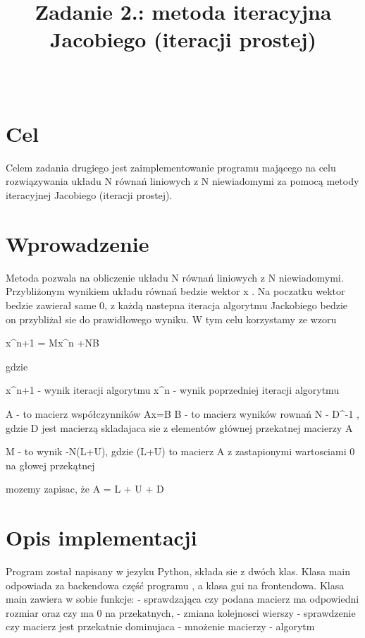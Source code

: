 \documentclass{classrep}
\author{%
  \studentinfo[229963@edu.p.lodz.pl]{Daniel Modrzejewski}{229963}\\
  \studentinfo[230004@edu.p.lodz.pl]{Mateusz Srebnik}{230004}%
}
\title{Zadanie 2.: metoda iteracyjna Jacobiego (iteracji prostej) }
\begin{document}
\maketitle
\thispagestyle{fancyplain}

\section{Cel}
{\color{black}
Celem zadania drugiego jest zaimplementowanie programu mającego na celu  rozwiązywania układu N równań liniowych z N niewiadomymi za pomocą metody iteracyjnej Jacobiego (iteracji prostej).
}

\section{Wprowadzenie}
{

Metoda pozwala na obliczenie układu N równań liniowych z N niewiadomymi. Przybliżonym wynikiem układu równań bedzie wektor x . Na poczatku wektor bedzie zawierał same 0, z każdą nastepna iteracja algorytmu Jackobiego bedzie on przybliżał sie do prawidłowego wyniku. W tym celu korzystamy ze wzoru \n

x^{n+1} = Mx^{n} +NB

gdzie 

x^{n+1} - wynik iteracji algorytmu 
x^{n} - wynik poprzedniej iteracji algorytmu 

A - to macierz współczynników Ax=B
B - to macierz wyników rownań
N - D^{-1} , gdzie D jest macierzą skladajaca sie z elementów głównej przekatnej macierzy A

M - to wynik -N(L+U), gdzie (L+U) to macierz A z zastapionymi wartosciami 0 na głowej przekątnej \n

mozemy zapisac, że \n
A = L + U + D
}

\section{Opis implementacji}
{
Program został napisany w jezyku Python, składa sie z dwóch klas. Klasa main odpowiada za backendowa część programu , a klasa gui na frontendowa.
Klasa main zawiera w sobie funkcje:
- sprawdzająca czy podana macierz ma odpowiedni rozmiar oraz czy ma 0 na przekatnych,
- zmiana kolejnosci wierszy
- sprawdzenie czy macierz jest przekatnie dominujaca 
- mnożenie macierzy
- algorytm 
}
\end{document}
